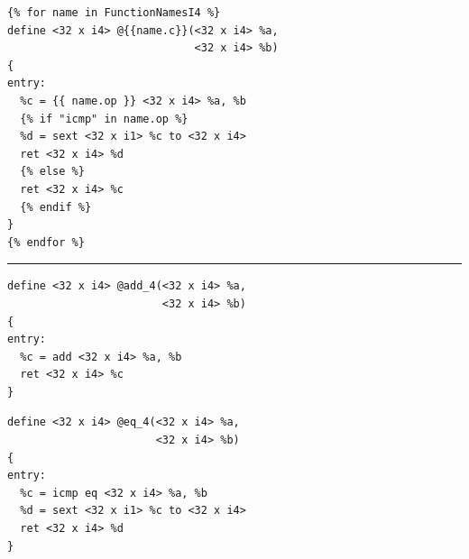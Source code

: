 \begin{program}
\begin{verbatim}
{% for name in FunctionNamesI4 %}
define <32 x i4> @{{name.c}}(<32 x i4> %a,
                             <32 x i4> %b)
{
entry:
  %c = {{ name.op }} <32 x i4> %a, %b
  {% if "icmp" in name.op %}
  %d = sext <32 x i1> %c to <32 x i4>
  ret <32 x i4> %d
  {% else %}
  ret <32 x i4> %c
  {% endif %}
}
{% endfor %}
\end{verbatim}
\rule{\textwidth}{1pt}

\begin{multicols}{2}
\begin{verbatim}
define <32 x i4> @add_4(<32 x i4> %a,
                        <32 x i4> %b)
{
entry:
  %c = add <32 x i4> %a, %b
  ret <32 x i4> %c
}
\end{verbatim}
\columnbreak
\begin{verbatim}
define <32 x i4> @eq_4(<32 x i4> %a,
                       <32 x i4> %b)
{
entry:
  %c = icmp eq <32 x i4> %a, %b
  %d = sext <32 x i1> %c to <32 x i4>
  ret <32 x i4> %d
}
\end{verbatim}
\end{multicols}
\caption[Templates for the IR Libray]{Templates for the IR Library. On the top is the template, and two different output are listed below. We use embedded for loop and if statements.}
\label{program:jinja}
\end{program}
